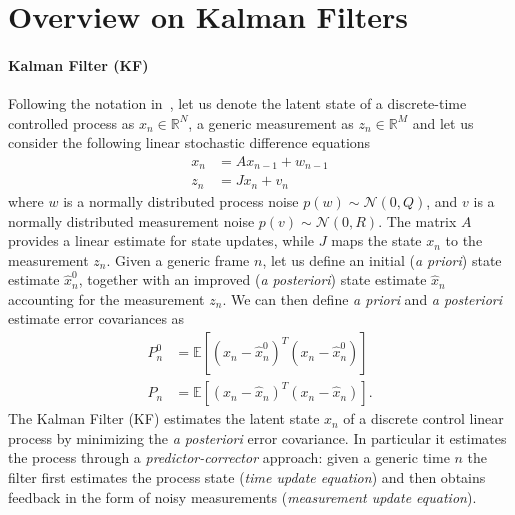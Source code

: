 \appendix
%


\section{Overview on Kalman Filters}
%
\paragraph{Kalman Filter (KF)} 
Following the notation in~\cite{welch1995introduction}, let us denote the latent state of a discrete-time controlled process as $x_n \in \mathbb{R}^N$, a generic measurement as $z_n \in \mathbb{R}^M$ and let us consider the following linear stochastic difference equations
% 
\begin{align}
x_n &= A x_{n - 1} +  w_{n - 1} \\
z_n &= J x_n + v_n
\end{align}
% 
where $w$ is a normally distributed process noise $p(w) \sim \mathcal{N}(0, Q)$, and $v$ is a normally distributed measurement noise $p(v) \sim \mathcal{N}(0, R)$. The matrix $A$ provides a linear estimate for state updates, while $J$ maps the state $x_n$ to the measurement $z_n$.
Given a generic frame $n$, let us define an initial (\textit{a priori}) state estimate $\hat{x}_n^0$, together with an improved (\textit{a posteriori}) state estimate $\hat{x}_n$ accounting for the measurement $z_n$. 
We can then define \textit{a priori} and \textit{a posteriori} estimate error covariances as
% 
\begin{align}
	P_n^0 &= \mathbb{E}[(x_n - \hat{x}_n^0)^T(x_n - \hat{x}_n^0)]\\
	P_n   &= \mathbb{E}[(x_n - \hat{x}_n)^T(x_n - \hat{x}_n)].
\end{align}
%
The Kalman Filter (KF) estimates the latent state $x_n$ of a discrete control linear process by minimizing the \textit{a posteriori} error covariance. In particular it estimates the process through a \textit{predictor-corrector} approach: given a generic time $n$ the filter first estimates the process state (\textit{time update equation}) and then obtains feedback in the form of noisy measurements (\textit{measurement update equation}).
